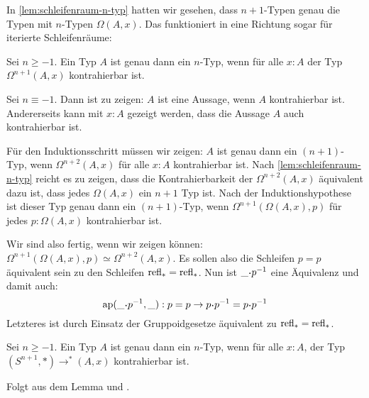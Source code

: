 In \cref{lem:schleifenraum-n-typ} hatten wir gesehen, dass $n+1$-Typen genau die Typen mit $n$-Typen $\Omega(A,x)$.
Das funktioniert in eine Richtung sogar für iterierte Schleifenräume:
\begin{lemma}
  Sei $n\geq -1$. Ein Typ $A$ ist genau dann ein $n$-Typ, wenn für alle $x:A$ der Typ $\Omega^{n+1}(A,x)$ kontrahierbar ist.
\end{lemma}
\begin{beweis}
  Sei $n\equiv -1$. Dann ist zu zeigen: $A$ ist eine Aussage, wenn $A$ kontrahierbar ist. Andererseits kann mit $x:A$ gezeigt werden, dass die Aussage $A$ auch kontrahierbar ist.
  
  Für den Induktionsschritt müssen wir zeigen: $A$ ist genau dann ein $(n+1)$-Typ, wenn $\Omega^{n+2}(A,x)$ für alle $x:A$ kontrahierbar ist.
  Nach \cref{lem:schleifenraum-n-typ} reicht es zu zeigen, dass die Kontrahierbarkeit der $\Omega^{n+2}(A,x)$ äquivalent dazu ist, dass jedes $\Omega(A,x)$ ein $n+1$ Typ ist.
  Nach der Induktionshypothese ist dieser Typ genau dann ein $(n+1)$-Typ, wenn
  $\Omega^{n+1}(\Omega(A,x),p)$ für jedes $p:\Omega(A,x)$ kontrahierbar ist.

  Wir sind also fertig, wenn wir zeigen können: $\Omega^{n+1}(\Omega(A,x),p)\simeq \Omega^{n+2}(A,x)$.
  Es sollen also die Schleifen $p=p$ äquivalent sein zu den Schleifen $\mathrm{refl}_\ast=\mathrm{refl}_\ast$.
  Nun ist $\_\kon p^{-1}$ eine Äquivalenz und damit auch:
  \[
    \mathrm{ap}(\_\kon p^{-1},\_):p=p\to p\kon p^{-1} = p\kon p^{-1}
  \]
  Letzteres ist durch Einsatz der Gruppoidgesetze äquivalent zu $\mathrm{refl}_\ast=\mathrm{refl}_\ast$.
\end{beweis}
\begin{korollar}
  \label{kor:n-abgeschnitten-kontrahierbarkeit}
  Sei $n\geq -1$. Ein Typ $A$ ist genau dann ein $n$-Typ, wenn für alle $x:A$, der Typ $(S^{n+1},\ast)\to^\ast(A,x)$ kontrahierbar ist.
\end{korollar}
\begin{beweis}
  Folgt aus dem Lemma und .
\end{beweis}

